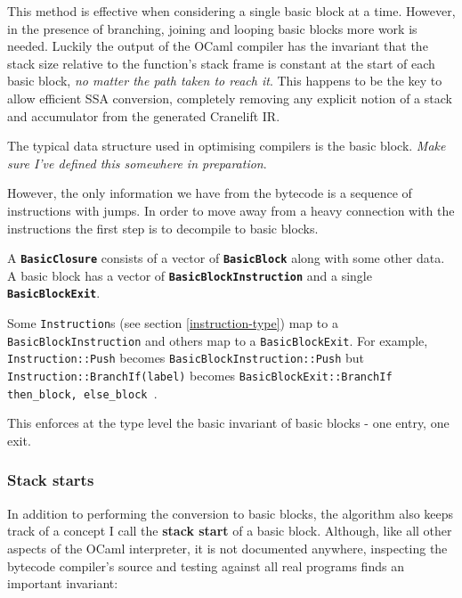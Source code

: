 This method is effective when considering a single basic block at a time. However, in the presence
of branching, joining and looping basic blocks more work is needed. Luckily the output of the OCaml
compiler has the invariant that the stack size relative to the function's stack frame is constant
at the start of each basic block, \emph{no matter the path taken to reach it}. This happens to be
the key to allow efficient SSA conversion, completely removing any explicit notion of a stack and
accumulator from the generated Cranelift IR.

\label{opt-bb}

The typical data structure used in optimising compilers is the basic block. \emph{Make sure I've
      defined this somewhere in preparation}.

However, the only information we have from the bytecode is a sequence of instructions with jumps.
In order to move away from a heavy connection with the instructions the first step is to decompile
to basic blocks.


A \textbf{\texttt{BasicClosure}} consists of a vector of \textbf{\texttt{BasicBlock}} along with
some other data. A basic block has a vector of \textbf{\texttt{BasicBlockInstruction}} and a single
\textbf{\texttt{BasicBlockExit}}.

Some \texttt{Instruction}s (see section \ref{instruction-type}) map to a
\texttt{BasicBlockInstruction} and others map to a \texttt{BasicBlockExit}. For example,
\texttt{Instruction::Push} becomes \texttt{BasicBlockInstruction::Push} but
\texttt{Instruction::BranchIf(label)} becomes \texttt{BasicBlockExit::BranchIf { then\_block,
else\_block }}.

This enforces at the type level the basic invariant of basic blocks - one entry, one exit.

\subsubsection{Stack starts}

In addition to performing the conversion to basic blocks, the algorithm also keeps track of a
concept I call the \textbf{stack start} of a basic block. Although, like all other aspects of the
OCaml interpreter, it is not documented anywhere, inspecting the bytecode compiler's source and
testing against all real programs finds an important invariant:

